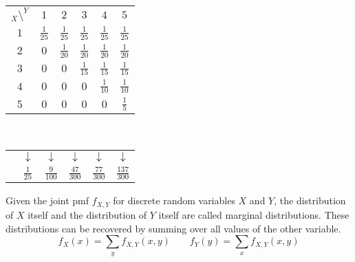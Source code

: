 \begin{examp}
\begin{center}
\renewcommand{\arraystretch}{1.5}
\begin{tabular}{c|ccccc}
$_{X} \setminus ^Y$ & $1$ & $2$ & $3$ & $4$ & $5$ \\
\cline{1-6}
$1$ & $\frac{1}{25}$ & $\frac{1}{25}$ & $\frac{1}{25}$ & $\frac{1}{25}$ & $\frac{1}{25}$  \\
$2$ & $0$ & $\frac{1}{20}$ & $\frac{1}{20}$ & $\frac{1}{20}$ & $\frac{1}{20}$ \\
$3$ & $0$ & $0$ & $\frac{1}{15}$ & $\frac{1}{15}$ & $\frac{1}{15}$  \\
$4$ & $0$ & $0$ & $0$ & $\frac{1}{10}$ & $\frac{1}{10}$ \\
$5$ & $0$ & $0$ & $0$ & $0$ & $\frac{1}{5}$ \\
\end{tabular}\\
\begin{tabular}{cccccc}
& $\downarrow$ & \hspace*{-0.1cm}$\downarrow$ & \hspace*{-0.05cm}$\downarrow$ & \hspace*{-0.2cm} $\downarrow$ & \hspace*{-0.2cm}$\downarrow$ \\
\hspace{0.8cm} & $\frac{1}{25}$ & \hspace*{-0.2cm} $\frac{9}{100}$ \hspace*{-0.1cm}& \hspace*{-0.15cm}$\frac{47}{300}$\hspace*{-0.1cm} &  \hspace*{-0.15cm} $\frac{77}{300}$  \hspace*{-0.1cm} & \hspace*{-0.2cm}$\frac{137}{300}$ \hspace*{-0.1cm} \\
\end{tabular}
\renewcommand{\arraystretch}{1}
\end{center}
\end{examp}

\begin{defn}
Given the joint pmf $f_{X,Y}$ for discrete random variables $X$ and $Y$, the distribution of $X$ itself and the distribution of $Y$ itself are called marginal distributions. These distributions can be recovered by summing over all values of the other variable.
$$f_X(x) = \sum_{y} f_{X,Y}(x,y) \qquad f_Y(y) = \sum_{x} f_{X,Y}(x,y)$$
\end{defn}

